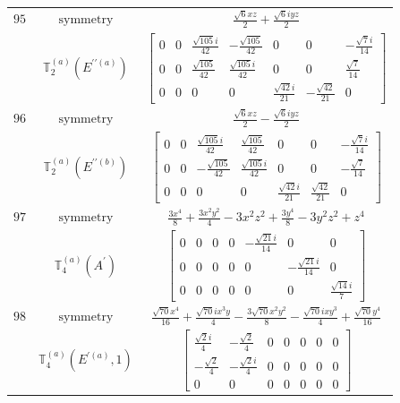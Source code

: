 \documentclass[fleqn,8pt,landscape]{jsarticle}
\begin{document}
\begin{longtable}{ccc}
$ 95 $ & $ \text{symmetry} $ & $ \frac{\sqrt{6} x z}{2} + \frac{\sqrt{6} i y z}{2} $ \\
$  $ & $ \mathbb{T}_{2}^{(a)}(E^{\prime\prime(a)}) $ & $ \begin{bmatrix} 0 & 0 & \frac{\sqrt{105} i}{42} & - \frac{\sqrt{105}}{42} & 0 & 0 & - \frac{\sqrt{7} i}{14} \\ 0 & 0 & \frac{\sqrt{105}}{42} & \frac{\sqrt{105} i}{42} & 0 & 0 & \frac{\sqrt{7}}{14} \\ 0 & 0 & 0 & 0 & \frac{\sqrt{42} i}{21} & - \frac{\sqrt{42}}{21} & 0 \end{bmatrix} $ \\ \hline
$ 96 $ & $ \text{symmetry} $ & $ \frac{\sqrt{6} x z}{2} - \frac{\sqrt{6} i y z}{2} $ \\
$  $ & $ \mathbb{T}_{2}^{(a)}(E^{\prime\prime(b)}) $ & $ \begin{bmatrix} 0 & 0 & \frac{\sqrt{105} i}{42} & \frac{\sqrt{105}}{42} & 0 & 0 & - \frac{\sqrt{7} i}{14} \\ 0 & 0 & - \frac{\sqrt{105}}{42} & \frac{\sqrt{105} i}{42} & 0 & 0 & - \frac{\sqrt{7}}{14} \\ 0 & 0 & 0 & 0 & \frac{\sqrt{42} i}{21} & \frac{\sqrt{42}}{21} & 0 \end{bmatrix} $ \\ \hline
$ 97 $ & $ \text{symmetry} $ & $ \frac{3 x^{4}}{8} + \frac{3 x^{2} y^{2}}{4} - 3 x^{2} z^{2} + \frac{3 y^{4}}{8} - 3 y^{2} z^{2} + z^{4} $ \\
$  $ & $ \mathbb{T}_{4}^{(a)}(A^{\prime}) $ & $ \begin{bmatrix} 0 & 0 & 0 & 0 & - \frac{\sqrt{21} i}{14} & 0 & 0 \\ 0 & 0 & 0 & 0 & 0 & - \frac{\sqrt{21} i}{14} & 0 \\ 0 & 0 & 0 & 0 & 0 & 0 & \frac{\sqrt{14} i}{7} \end{bmatrix} $ \\ \hline
$ 98 $ & $ \text{symmetry} $ & $ \frac{\sqrt{70} x^{4}}{16} + \frac{\sqrt{70} i x^{3} y}{4} - \frac{3 \sqrt{70} x^{2} y^{2}}{8} - \frac{\sqrt{70} i x y^{3}}{4} + \frac{\sqrt{70} y^{4}}{16} $ \\
$  $ & $ \mathbb{T}_{4}^{(a)}(E^{\prime(a)},1) $ & $ \begin{bmatrix} \frac{\sqrt{2} i}{4} & - \frac{\sqrt{2}}{4} & 0 & 0 & 0 & 0 & 0 \\ - \frac{\sqrt{2}}{4} & - \frac{\sqrt{2} i}{4} & 0 & 0 & 0 & 0 & 0 \\ 0 & 0 & 0 & 0 & 0 & 0 & 0 \end{bmatrix} $ \\ \hline

\end{longtable}
\end{document}
